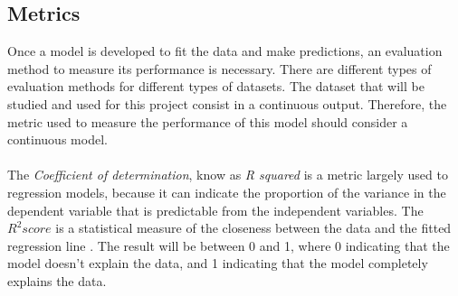 \subsection{Metrics}
\label{sec:metrics}
Once a model is developed to fit the data and make predictions, an evaluation method to measure its performance is necessary. There are different types of evaluation methods for different types
of datasets. The dataset that will be studied and used for this project consist in a continuous output. Therefore, the metric used to measure the performance of this model should consider a continuous model.\\
\newline
\\
The \textit{Coefficient of determination}, know as \textit{R squared} is a metric largely used to regression models, because it can indicate the proportion of the variance in the dependent variable
that is predictable from the independent variables\cite{R2_1}.
The $R^2 score$ is a statistical measure of the closeness between the data and the fitted regression line \cite{R2}. The result will be between 0 and 1, where 0 indicating that the model doesn't explain 
the data, and 1 indicating that the model completely explains the data.\\